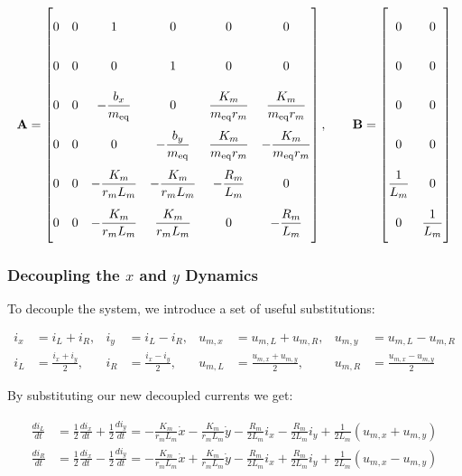 \begin{equation*}
\mathbf{A} =
\begin{bmatrix}
\mstrut 0 & 0 & 1 & 0 & 0 & 0 \\
\mstrut 0 & 0 & 0 & 1 & 0 & 0 \\
\mstrut 0 & 0 & -\dfrac{b_x}{m_{\mathrm{eq}}} & 0 & \dfrac{K_m}{m_{\mathrm{eq}} r_m} & \dfrac{K_m}{m_{\mathrm{eq}} r_m} \\
\mstrut 0 & 0 & 0 & -\dfrac{b_y}{m_{\mathrm{eq}}} & \dfrac{K_m}{m_{\mathrm{eq}} r_m} & -\dfrac{K_m}{m_{\mathrm{eq}} r_m} \\
\mstrut 0 & 0 & -\dfrac{K_m}{r_m L_m} & -\dfrac{K_m}{r_m L_m} & -\dfrac{R_m}{L_m} & 0 \\
\mstrut 0 & 0 & -\dfrac{K_m}{r_m L_m} & \dfrac{K_m}{r_m L_m} & 0 & -\dfrac{R_m}{L_m}
\end{bmatrix},
\qquad
\mathbf{B} =
\begin{bmatrix}
\mstrut 0 & 0 \\ \mstrut 0 & 0 \\ \mstrut 0 & 0 \\ \mstrut 0 & 0 \\ \mstrut \dfrac{1}{L_m} & 0 \\ \mstrut 0 & \dfrac{1}{L_m}
\end{bmatrix}
\end{equation*}

\subsubsection{Decoupling the \texorpdfstring{$x$}{x} and \texorpdfstring{$y$}{y} Dynamics}
To decouple the system, we introduce a set of useful substitutions:

\begin{equation}
\label{eq:decoupling_subs}
\boxed{
\begin{aligned}
i_x &= i_L + i_R, & i_y &= i_L - i_R, & u_{m,x} &= u_{m,L} + u_{m,R}, & u_{m,y} &= u_{m,L} - u_{m,R} \\
i_L &= \frac{i_x + i_y}{2}, & i_R &= \frac{i_x - i_y}{2}, & u_{m,L} &= \frac{u_{m,x} + u_{m,y}}{2}, & u_{m,R} &= \frac{u_{m,x} - u_{m,y}}{2}
\end{aligned}}
\end{equation}

By substituting our new decoupled currents we get:

\begin{equation*}
\begin{aligned}
\frac{di_L}{dt} &= \tfrac{1}{2}\frac{di_x}{dt} + \tfrac{1}{2}\frac{di_y}{dt}
  = -\frac{K_m}{r_m L_m}\dot x - \frac{K_m}{r_m L_m}\dot y
    - \frac{R_m}{2L_m} i_x - \frac{R_m}{2L_m} i_y + \frac{1}{2L_m}\left(u_{m,x} + u_{m,y}\right) \\
\frac{di_R}{dt} &= \tfrac{1}{2}\frac{di_x}{dt} - \tfrac{1}{2}\frac{di_y}{dt}
  = -\frac{K_m}{r_m L_m}\dot x + \frac{K_m}{r_m L_m}\dot y
    - \frac{R_m}{2L_m} i_x + \frac{R_m}{2L_m} i_y + \frac{1}{2L_m}\left(u_{m,x} - u_{m,y}\right)
\end{aligned}
\end{equation*}

